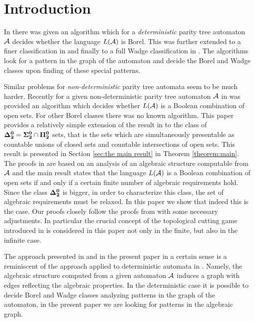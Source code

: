 
\section{Introduction}
In \cite{niwalu} there was given an algorithm which for a \emph{deterministic} parity tree automaton ${\mathcal A}$ decides whether the language $L({\mathcal A})$ is Borel. This was further extended to a finer classification in \cite{murlak2} and finally to a full Wadge classification in \cite{murlak}. The algorithms look for a pattern in the graph of the automaton and decide the Borel and Wadge classes upon finding of these special patterns. 

Similar problems for \emph{non-deterministic} parity tree automata seem to be much harder. 
Recently for a given non-deterministic parity tree automaton ${\mathcal A}$ in \cite{bp} was provided an algorithm which decides
whether $L({\mathcal A})$ is a Boolean combination of open sets. For other Borel classes there was no known algorithm. This paper provides a relatively simple extension 
of the result in \cite{bp} to the class of ${\bf \Delta^0_2} = {\bf\Sigma^0_2}\cap{\bf\Pi^0_2}$ sets, that is the sets which are simultaneously presentable as countable unions of closed sets and countable intersections of open sets. This result is presented in Section \ref{sec:the main result} in Theorem \ref{theorem:main}. The proofs in \cite{bp} are based on an analysis of an algebraic structure computable from ${\mathcal A}$ and the main result states that the language $L({\mathcal A})$ is a Boolean combination of open sets if and only if a certain finite number of algebraic requirements hold. Since the class ${\bf \Delta^0_2}$ is bigger, in order to characterize this class, the set of algebraic requirements must be relaxed. In this paper we show that indeed this is the case. Our proofs closely follow the proofs from \cite{bp} with some necessary adjustments. In particular the crucial concept of the topological cutting game introduced in \cite{bp} is considered in this paper not only in the finite, but also in the infinite case. 

The approach presented in \cite{bp} and in the present paper in a certain sense is a reminiscent of the approach applied to deterministic automata in \cite{murlak2,murlak,niwalu}. Namely, the algebraic structure computed from a given automaton ${\mathcal A}$ induces a graph with edges reflecting the algebraic properties. In the deterministic case it is possible to decide Borel and Wadge classes analyzing patterns in the graph of the automaton, in the present paper we are looking for patterns in the algebraic graph. 


